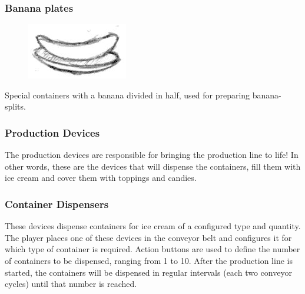 \documentclass[a4paper]{scrartcl}
\begin{document}
        \subsubsection{Banana plates}
            \begin{minipage}[t][2em][t]{\textwidth}
                \begin{figure}
                    \vspace{-20pt}
                    \includegraphics[scale=1]{devices/banana_plate}
                    \vspace{-25pt}
                \end{figure}

                Special containers with a banana divided in half, used for
                preparing banana-splits.
            \end{minipage}

    \subsubsection{Production Devices}
        The production devices are responsible for bringing the production line
        to life! In other words, these are the devices that will dispense the
        containers, fill them with ice cream and cover them with toppings and
        candies.

        \subsubsection{Container Dispensers}
            These devices dispense containers for ice cream of a configured type
            and quantity. The player places one of these devices in the conveyor
            belt and configures it for which type of container is required.
            Action buttons are used to define the number of containers to be
            dispensed, ranging from 1 to 10. After the production line is
            started, the containers will be dispensed in regular intervals (each
            two conveyor cycles) until that number is reached.
\end{document}

